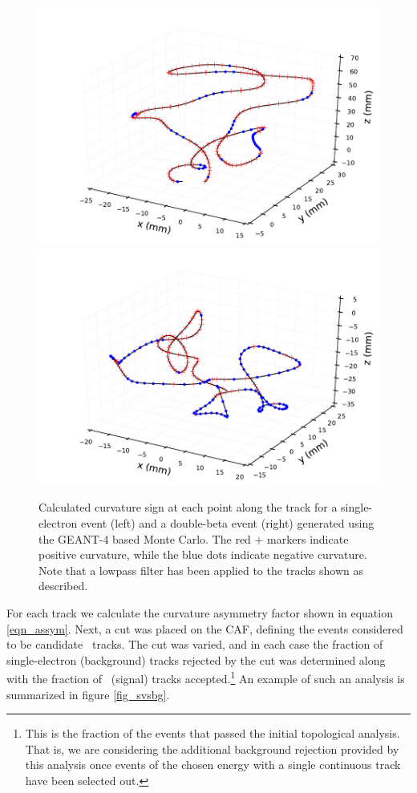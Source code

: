 \documentclass{JINST}
\begin{document}
\begin{figure}[!htb]
	\includegraphics[scale=0.48]{fig/plt_trkcurv_nmagse2_6.pdf}
	\includegraphics[scale=0.48]{fig/plt_trkcurv_nmagbb2_2.pdf}
	\caption{\label{fig_trkcurv}Calculated curvature sign at each point along the track for a single-electron event (left) and a double-beta event (right) generated using the GEANT-4 based Monte Carlo.  The red $+$ markers indicate positive curvature, while the blue dots indicate negative curvature.  Note that a lowpass filter has been applied to the tracks shown as described.}
\end{figure}

For each track we calculate the curvature asymmetry factor shown in equation \ref{eqn_assym}. Next, a cut was placed on the CAF, defining the events considered to be candidate 
\bbonu\ tracks.  The cut was varied, and in each case 
the fraction of single-electron (background) tracks rejected by the cut was determined along with the fraction of 
\bbonu\ (signal) tracks accepted.\footnote{This is the fraction of the events that passed the initial 
topological analysis. That is, we are considering the additional background rejection provided by this analysis  
once events of the chosen energy with a single continuous track have been selected out.}  An example of such 
an analysis is summarized in figure \ref{fig_svsbg}.
\end{document}
